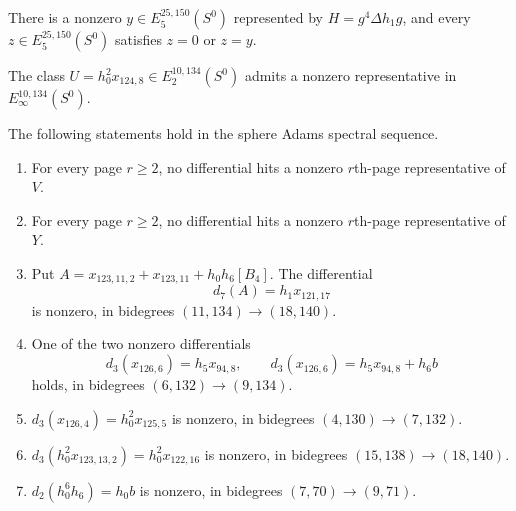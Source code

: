 \begin{theorem}
\label{frontier:AdamsCalculations:d30404f96c16}
There is a nonzero $y\in E_5^{25,150}(S^0)$ represented by $H=g^4\Delta h_1g$, and every $z\in E_5^{25,150}(S^0)$ satisfies $z=0$ or $z=y$.
\end{theorem}



\begin{theorem}
\label{frontier:AdamsCalculations:8f935e2bb066}
The class $U=h_0^2x_{124,8}\in E_2^{10,134}(S^0)$ admits a nonzero representative in $E_\infty^{10,134}(S^0)$.
\end{theorem}



\begin{theorem}
\label{frontier:AdamsCalculations:cd5b5345e83c}
The following statements hold in the sphere Adams spectral sequence.
\begin{enumerate}
\item For every page $r\geq2$, no differential hits a nonzero $r$th-page representative of $V$.
\item For every page $r\geq2$, no differential hits a nonzero $r$th-page representative of $Y$.
\item Put $A=x_{123,11,2}+x_{123,11}+h_0h_6[B_4]$. The differential
\[d_7(A)=h_1x_{121,17}\]
is nonzero, in bidegrees $(11,134)\longrightarrow(18,140)$.
\item One of the two nonzero differentials
\[d_3(x_{126,6})=h_5x_{94,8},\qquad d_3(x_{126,6})=h_5x_{94,8}+h_6b\]
holds, in bidegrees $(6,132)\longrightarrow(9,134)$.
\item $d_3(x_{126,4})=h_0^2x_{125,5}$ is nonzero, in bidegrees $(4,130)\longrightarrow(7,132)$.
\item $d_3(h_0^2x_{123,13,2})=h_0^2x_{122,16}$ is nonzero, in bidegrees $(15,138)\longrightarrow(18,140)$.
\item $d_2(h_0^6h_6)=h_0b$ is nonzero, in bidegrees $(7,70)\longrightarrow(9,71)$.
\end{enumerate}
\end{theorem}

